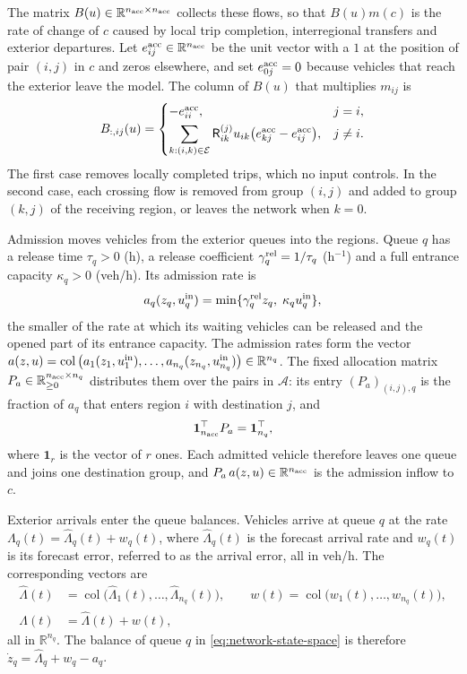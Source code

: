 \documentclass[final]{cas-sc}
\theoremstyle{definition}
\theoremstyle{plain}
\theoremstyle{definition}
\theoremstyle{plain}
\newcommand{\R}{\mathbb{R}}
\begin{document}
The matrix $B(u)\in\R^{n_{\rm acc}\times n_{\rm acc}}$ collects these
flows, so that $B(u)m(c)$ is the rate of change of $c$ caused by local
trip completion, interregional transfers and exterior departures. Let
$e_{ij}^{\rm acc}\in\R^{n_{\rm acc}}$ be the unit vector with a $1$ at
the position of pair $(i,j)$ in $c$ and zeros elsewhere, and set
$e_{0j}^{\rm acc}=0$ because vehicles that reach the exterior leave the
model. The column of $B(u)$ that multiplies $m_{ij}$ is
\[
B_{:,ij}(u)=
\begin{cases}
-e_{ii}^{\rm acc},&j=i,\\[3pt]
\displaystyle\sum_{k:(i,k)\in\mathcal E}
\mathsf R_{ik}^{(j)}u_{ik}\big(e_{kj}^{\rm acc}-e_{ij}^{\rm acc}\big),
&j\ne i.
\end{cases}
\]
The first case removes locally completed trips, which no input
controls. In the second case, each crossing flow is removed from group
$(i,j)$ and added to group $(k,j)$ of the receiving region, or leaves
the network when $k=0$.

Admission moves vehicles from the exterior queues into the regions.
Queue $q$ has a release time $\tau_q>0$ (h), a release coefficient
$\gamma_q^{\rm rel}=1/\tau_q$ (h$^{-1}$) and a full entrance capacity
$\kappa_q>0$ (veh/h). Its admission rate is
\[
a_q(z_q,u_q^{\rm in})
=\min\{\gamma_q^{\rm rel}z_q,\;\kappa_q u_q^{\rm in}\},
\]
the smaller of the rate at which its waiting vehicles can be released
and the opened part of its entrance capacity. The admission rates form
the vector
$a(z,u)=\operatorname{col}\big(a_1(z_1,u_1^{\rm in}),\ldots,
a_{n_q}(z_{n_q},u_{n_q}^{\rm in})\big)\in\R^{n_q}$. The fixed allocation
matrix $P_a\in\R_{\ge0}^{n_{\rm acc}\times n_q}$ distributes them over
the pairs in $\mathcal A$: its entry $(P_a)_{(i,j),q}$ is the fraction
of $a_q$ that enters region $i$ with destination $j$, and
\[
\mathbf 1_{n_{\rm acc}}^\top P_a=\mathbf 1_{n_q}^\top ,
\]
where $\mathbf 1_r$ is the vector of $r$ ones. Each admitted vehicle
therefore leaves one queue and joins one destination group, and
$P_a\,a(z,u)\in\R^{n_{\rm acc}}$ is the admission inflow to $c$.

Exterior arrivals enter the queue balances. Vehicles arrive at queue
$q$ at the rate $\Lambda_q(t)=\widehat\Lambda_q(t)+w_q(t)$, where
$\widehat\Lambda_q(t)$ is the forecast arrival rate and $w_q(t)$ is its
forecast error, referred to as the arrival error, all in veh/h. The
corresponding vectors are
\[
\begin{aligned}
\widehat\Lambda(t)&=\operatorname{col}\big(\widehat\Lambda_1(t),\ldots,
\widehat\Lambda_{n_q}(t)\big),\qquad
w(t)=\operatorname{col}\big(w_1(t),\ldots,w_{n_q}(t)\big),\\
\Lambda(t)&=\widehat\Lambda(t)+w(t),
\end{aligned}
\]
all in $\R^{n_q}$. The balance of queue $q$ in
\eqref{eq:network-state-space} is therefore
$\dot z_q=\widehat\Lambda_q+w_q-a_q$.
\end{document}
